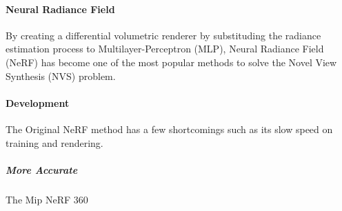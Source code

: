 \paragraph{Neural Radiance Field}

By creating a differential volumetric renderer by substituding the radiance estimation process to Multilayer-Perceptron (MLP), Neural Radiance Field \cite{mildenhallNeRFRepresentingScenes2020}(NeRF) has become one of the most popular methods to solve the Novel View Synthesis (NVS) problem.

\paragraph{Development}

The Original NeRF method has a few shortcomings such as its slow speed on training and rendering.

\subparagraph{More Accurate}

The Mip NeRF 360 \cite{barronMipNeRF360Unbounded2022}
